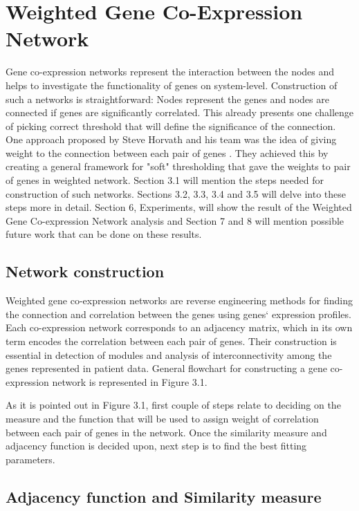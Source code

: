 \documentclass{ba-kecs}
\numberwithin{figure}{section}
\numberwithin{equation}{section}
\begin{document}
\section{Weighted Gene Co-Expression Network}
Gene co-expression networks represent the interaction between the nodes and helps to investigate the functionality of genes on system-level. Construction of such a networks is straightforward: Nodes represent the genes and nodes are connected if genes are significantly correlated. This already presents one challenge of picking correct threshold that will define the significance of the connection. One approach proposed by Steve Horvath and his team was the idea of giving weight to the connection between each pair of genes \cite{wgcna3}. They achieved this by creating a general framework for "soft" thresholding that gave the weights to pair of genes in weighted network. Section 3.1 will mention the steps needed for construction of such networks. Sections 3.2, 3.3, 3.4 and 3.5 will delve into these steps more in detail. Section 6, Experiments, will show the result of the Weighted Gene Co-expression Network analysis and Section 7 and 8 will mention possible future work that can be done on these results.

\subsection{Network construction}

Weighted gene co-expression networks are reverse engineering methods for finding the connection and correlation between the genes using genes` expression profiles. Each co-expression network corresponds to an adjacency matrix, which in its own term encodes the correlation between each pair of genes. Their construction is essential in detection of modules and analysis of interconnectivity among the genes represented in patient data. General flowchart for constructing a gene co-expression network is represented in Figure 3.1.

As it is pointed out in Figure 3.1, first couple of steps relate to deciding on the measure and the function that will be used to assign weight of correlation between each pair of genes in the network. Once the similarity measure and adjacency function is decided upon, next step is to find the best fitting parameters.


\subsection{Adjacency function and Similarity measure}
\end{document}
